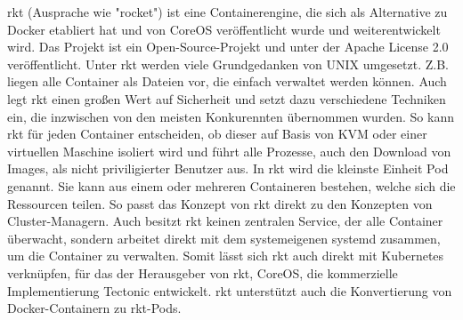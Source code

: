 rkt (Ausprache wie "rocket") ist eine Containerengine, die sich als Alternative zu Docker etabliert hat und von CoreOS veröffentlicht wurde und weiterentwickelt wird. Das Projekt ist ein Open-Source-Projekt und unter der Apache License 2.0 veröffentlicht.\cite{RepoRkt} Unter rkt werden viele Grundgedanken von UNIX umgesetzt. Z.B. liegen alle Container als Dateien vor, die einfach verwaltet werden können. Auch legt rkt einen großen Wert auf Sicherheit und setzt dazu verschiedene Techniken ein, die inzwischen von den meisten Konkurennten übernommen wurden. So kann rkt für jeden Container entscheiden, ob dieser auf Basis von KVM oder einer virtuellen Maschine isoliert wird und führt alle Prozesse, auch den Download von Images, als nicht priviligierter Benutzer aus. In rkt wird die kleinste Einheit Pod genannt. Sie kann aus einem oder mehreren Containeren bestehen, welche sich die Ressourcen teilen. So passt das Konzept von  rkt direkt zu den Konzepten von  Cluster-Managern. Auch besitzt rkt keinen zentralen Service, der alle Container überwacht, sondern arbeitet direkt mit dem systemeigenen systemd zusammen, um die Container zu verwalten. Somit lässt sich rkt auch direkt mit Kubernetes verknüpfen, für das der Herausgeber von rkt, CoreOS, die kommerzielle Implementierung Tectonic entwickelt. rkt unterstützt auch die Konvertierung von Docker-Containern zu rkt-Pods.\cite{HomepageRkt,ixrkt}

